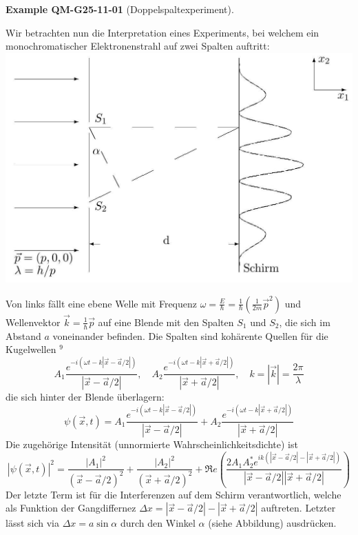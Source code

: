 \documentclass[10pt, letterpaper]{article}
\newcommand{\CustomHeading}[3]{%
  \par\medskip\noindent%
  \textbf{#1 #2} \textnormal{(#3)}.\enskip%
}
\newenvironment{EXA}[2]{\begin{unitbox}\CustomHeading{Example}{#1}{#2}}{\end{unitbox}}
\begin{document}
\begin{EXA}{QM-G25-11-01}{Doppelspaltexperiment}
Wir betrachten nun die Interpretation eines Experiments, bei welchem ein monochromatischer Elektronenstrahl auf zwei Spalten auftritt:\\
\includegraphics[scale=0.2, center]{2025_05_21_11b1754c718f6fcf84f8g-19}

Von links fällt eine ebene Welle mit Frequenz $\omega=\frac{E}{\hbar}=\frac{1}{\hbar}\left(\frac{1}{2 m} \vec{p}^{2}\right)$ und Wellenvektor $\vec{k}=\frac{1}{\hbar} \vec{p}$ auf eine Blende mit den Spalten $S_{1}$ und $S_{2}$, die sich im Abstand $a$ voneinander befinden. Die Spalten sind kohärente Quellen für die Kugelwellen ${ }^{9}$
$$
A_{1} \frac{e^{-i(\omega t-k|\vec{x}-\vec{a} / 2|)}}{|\vec{x}-\vec{a} / 2|}, \quad A_{2} \frac{e^{-i(\omega t-k|\vec{x}+\vec{a} / 2|)}}{|\vec{x}+\vec{a} / 2|}, \quad k=|\vec{k}|=\frac{2 \pi}{\lambda}
$$
die sich hinter der Blende überlagern:
$$
\psi(\vec{x}, t)=A_{1} \frac{e^{-i(\omega t-k|\vec{x}-\vec{a} / 2|)}}{|\vec{x}-\vec{a} / 2|}+A_{2} \frac{e^{-i(\omega t-k|\vec{x}+\vec{a} / 2|)}}{|\vec{x}+\vec{a} / 2|}
$$
Die zugehörige Intensität (unnormierte Wahrscheinlichkeitsdichte) ist
$$
|\psi(\vec{x}, t)|^{2}=\frac{\left|A_{1}\right|^{2}}{(\vec{x}-\vec{a} / 2)^{2}}+\frac{\left|A_{2}\right|^{2}}{(\vec{x}+\vec{a} / 2)^{2}}+\Re e\left(\frac{2 A_{1} A_{2}^{*} e^{i k(|\vec{x}-\vec{a} / 2|-|\vec{x}+\vec{a} / 2|)}}{|\vec{x}-\vec{a} / 2||\vec{x}+\vec{a} / 2|}\right)
$$
Der letzte Term ist für die Interferenzen auf dem Schirm verantwortlich, welche als Funktion der Gangdiffernez $\Delta x=|\vec{x}-\vec{a} / 2|-|\vec{x}+\vec{a} / 2|$ auftreten. Letzter lässt sich via $\Delta x=a \sin \alpha$ durch den Winkel $\alpha$ (siehe Abbildung) ausdrücken.
\end{EXA}
\end{document}
